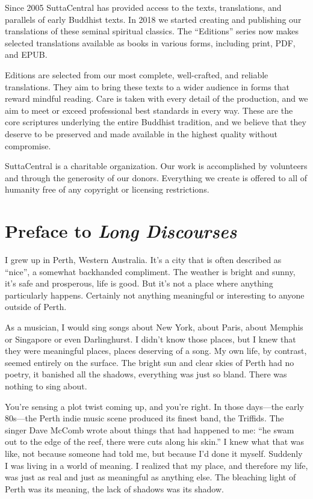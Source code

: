 \documentclass[12pt,openany]{book}%
\begin{document}
Since 2005 SuttaCentral has provided access to the texts, translations, and parallels of early Buddhist texts. In 2018 we started creating and publishing our translations of these seminal spiritual classics. The “Editions” series now makes selected translations available as books in various forms, including print, PDF, and EPUB.

Editions are selected from our most complete, well-crafted, and reliable translations. They aim to bring these texts to a wider audience in forms that reward mindful reading. Care is taken with every detail of the production, and we aim to meet or exceed professional best standards in every way. These are the core scriptures underlying the entire Buddhist tradition, and we believe that they deserve to be preserved and made available in the highest quality without compromise.

SuttaCentral is a charitable organization. Our work is accomplished by volunteers and through the generosity of our donors. Everything we create is offered to all of humanity free of any copyright or licensing restrictions. 

%
\chapter*{Preface to \emph{Long Discourses}}

I grew up in Perth, Western Australia. It’s a city that is often described as “nice”, a somewhat backhanded compliment. The weather is bright and sunny, it’s safe and prosperous, life is good. But it’s not a place where anything particularly happens. Certainly not anything meaningful or interesting to anyone outside of Perth.

As a musician, I would sing songs about New York, about Paris, about Memphis or Singapore or even Darlinghurst. I didn’t know those places, but I knew that they were meaningful places, places deserving of a song. My own life, by contrast, seemed entirely on the surface. The bright sun and clear skies of Perth had no poetry, it banished all the shadows, everything was just so bland. There was nothing to sing about.

You’re sensing a plot twist coming up, and you’re right. In those days—the early 80s—the Perth indie music scene produced its finest band, the Triffids. The singer Dave McComb wrote about things that had happened to me: “he swam out to the edge of the reef, there were cuts along his skin.” I knew what that was like, not because someone had told me, but because I’d done it myself. Suddenly I was living in a world of meaning. I realized that my place, and therefore my life, was just as real and just as meaningful as anything else. The bleaching light of Perth was its meaning, the lack of shadows was its shadow.
\end{document}
